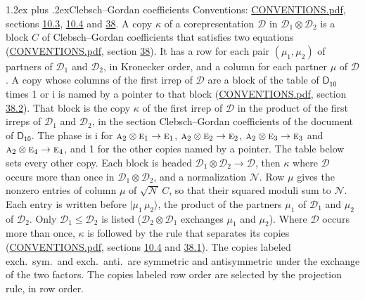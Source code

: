 \documentclass[10pt,a4paper]{article}
\makeatletter
\renewcommand\section{\@startsection{section}{1}{\z@}{-3ex plus -1ex minus -.2ex}%
  {1.2ex plus .2ex}{\normalfont\large\sffamily\bfseries\color{parttitle}}}
\numberwithin{equation}{section}
\newcommand{\grp}[1]{\mathsf{#1}}
\newcommand{\irr}[1]{\text{\normalfont\scshape #1}}
\newcommand{\iunit}{\mathrm{i}}
\newcommand{\irrprod}{\otimes}
\newcommand{\mult}{\kappa}
\newcommand{\intx}{\mu}
\newcommand{\cgnorm}{\mathcal{N}}
\newcommand{\prodket}[2]{\lvert {#1}\,{#2}\rangle}
\makeatother
\begin{document}
\section{Clebsch--Gordan coefficients}\label{s:clebsch_gordan}
Conventions: \href{../../CONVENTIONS.pdf}{CONVENTIONS.pdf}, sections \href{../../../rotation/CONVENTIONS.pdf\#conv.10.3}{10.3}, \href{../../../rotation/CONVENTIONS.pdf\#conv.10.4}{10.4} and \href{../../CONVENTIONS.pdf\#conv.38}{38}.
\leavevmode\label{n:index.copy}\label{n:matrix.cg.stored}A copy $\mult$ of a corepresentation $\mathcal{D}$ in $\mathcal{D}_1\irrprod\mathcal{D}_2$ is a block $C$ of Clebsch--Gordan coefficients that satisfies two equations (\href{../../CONVENTIONS.pdf}{CONVENTIONS.pdf}, section \href{../../CONVENTIONS.pdf\#conv.38}{38}). \label{n:index.cg}It has a row for each pair $(\intx_1, \intx_2)$ of partners of $\mathcal{D}_1$ and $\mathcal{D}_2$, in Kronecker order, and a column for each partner $\intx$ of $\mathcal{D}$.
A copy whose columns of the first irrep of $\mathcal{D}$ are a block of the table of $\grp{D_{10}}$ times 1 or $\iunit$ is named by a pointer to that block (\href{../../CONVENTIONS.pdf}{CONVENTIONS.pdf}, section \href{../../CONVENTIONS.pdf\#conv.38.2}{38.2}). That block is the copy $\mult$ of the first irrep of $\mathcal{D}$ in the product of the first irreps of $\mathcal{D}_1$ and $\mathcal{D}_2$, in the section Clebsch--Gordan coefficients of the document of \href{../../../rotation/data/pdf/D10.pdf}{$\grp{D_{10}}$}. The phase is $\iunit$ for $\irr{a}_{2}\irrprod \irr{e}_{1}\to \irr{e}_{1}$, $\irr{a}_{2}\irrprod \irr{e}_{2}\to \irr{e}_{2}$, $\irr{a}_{2}\irrprod \irr{e}_{3}\to \irr{e}_{3}$ and $\irr{a}_{2}\irrprod \irr{e}_{4}\to \irr{e}_{4}$, and 1 for the other copies named by a pointer. The table below sets every other copy.
Each block is headed $\mathcal{D}_1\irrprod\mathcal{D}_2\to\mathcal{D}$, then $\mult$ where $\mathcal{D}$ occurs more than once in $\mathcal{D}_1\irrprod\mathcal{D}_2$, and a normalization $\cgnorm$. Row $\intx$ gives the nonzero entries of column $\intx$ of $\sqrt{\cgnorm}\,C$, so that their squared moduli sum to $\cgnorm$. \label{n:vector.ket.product}Each entry is written before $\prodket{\intx_1}{\intx_2}$, the product of the partners $\intx_1$ of $\mathcal{D}_1$ and $\intx_2$ of $\mathcal{D}_2$. Only $\mathcal{D}_1 \le \mathcal{D}_2$ is listed ($\mathcal{D}_2\irrprod\mathcal{D}_1$ exchanges $\intx_1$ and $\intx_2$).
Where $\mathcal{D}$ occurs more than once, $\mult$ is followed by the rule that separates its copies (\href{../../CONVENTIONS.pdf}{CONVENTIONS.pdf}, sections \href{../../../rotation/CONVENTIONS.pdf\#conv.10.4}{10.4} and \href{../../CONVENTIONS.pdf\#conv.38.1}{38.1}). \label{n:abbreviation.exchange}The copies labeled exch.\ sym.\ and exch.\ anti.\ are symmetric and antisymmetric under the exchange of the two factors. The copies labeled row order are selected by the projection rule, in row order.
\end{document}
